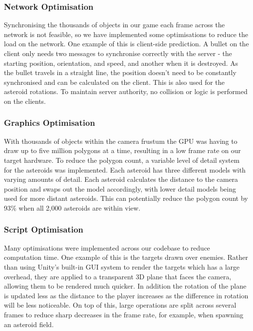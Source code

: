 \documentclass[a4paper,11pt]{article}
\begin{document}
\subsubsection{Network Optimisation}
Synchronising the thousands of objects in our game each frame across the network is not feasible, so we have implemented some optimisations to reduce the load on the network. One example of this is client-side prediction. A bullet on the client only needs two messages to synchronise correctly with the server - the starting position, orientation, and speed, and another when it is destroyed. As the bullet travels in a straight line, the position doesn’t need to be constantly synchronised and can be calculated on the client. This is also used for the asteroid rotations. To maintain server authority, no collision or logic is performed on the clients.

\subsubsection{Graphics Optimisation}
With thousands of objects within the camera frustum the GPU was having to draw up to five million polygons at a time, resulting in a low frame rate on our target hardware. To reduce the polygon count, a variable level of detail system for the asteroids was implemented. Each asteroid has three different models with varying amounts of detail. Each asteroid calculates the distance to the camera position and swaps out the model accordingly, with lower detail models being used for more distant asteroids. This can potentially reduce the polygon count by 93\% when all 2,000 asteroids are within view.

\subsubsection{Script Optimisation}
Many optimisations were implemented across our codebase to reduce computation time. One example of this is the targets drawn over enemies. Rather than using Unity’s built-in GUI system to render the targets which has a large overhead, they are applied to a transparent 3D plane that faces the camera, allowing them to be rendered much quicker. In addition the rotation of the plane is updated less as the distance to the player increases as the difference in rotation will be less noticeable. On top of this, large operations are split across several frames to reduce sharp decreases in the frame rate, for example, when spawning an asteroid field.
\end{document}
